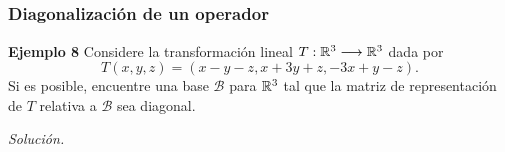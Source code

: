 \subsection{}
%
\begin{frame}\frametitle{Diagonalización de un operador}
	
	\begin{ej}{\textbf{Ejemplo 8}}\justifying
		Considere la transformación lineal $T:\mathbb{R}^3\longrightarrow\mathbb{R}^3$ dada por
		\[
			T(x,y,z) = (x-y-z,x+3y+z,-3x+y-z).
		\]
		Si es posible, encuentre una base $\mathcal{B}$ para $\mathbb{R}^3$ tal que la matriz de representación
		de $T$ relativa a $\mathcal{B}$ sea diagonal.
	\end{ej}
	\textit{Solución.}
	
\end{frame}
